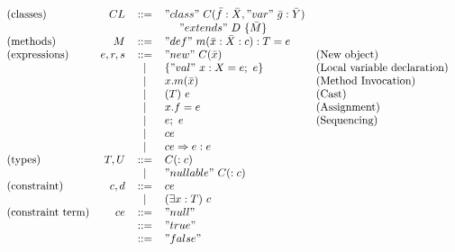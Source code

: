 \documentclass[nocopyrightspace,preprint,10pt]{sigplanconf}
\newcommand\alt{\bnf}
\newcommand\Implies{\Rightarrow}
\begin{document}
\begin{figure}
\[
\begin{array}{lrcll}
\mbox{(classes)}         & CL    &{::=}& "class"~C(\bar{f}:\bar{X}, "var"~\bar{g}:\bar{Y}) & \\
                         &       &     & ~~~~"extends"~D~\{\bar{M}\}                       & \\
\mbox{(methods)}         & M     &{::=}& "def"~m(\bar{x}:\bar{X} : c):T = e                & \\
\mbox{(expressions)}     & e,r,s &{::=}& "new"~C(\bar{x})                                  & \mbox{(New object)} \\
                         &       &\alt & \{ "val"~x:X=e;~e \}                              & \mbox{(Local variable declaration)} \\
                         &       &\alt & x.m(\bar{x})                                      & \mbox{(Method Invocation)} \\
                         &       &\alt & (T)~e                                             & \mbox{(Cast)} \\
                         &       &\alt & x.f=e                                             & \mbox{(Assignment)} \\
                         &       &\alt & e;~e                                              & \mbox{(Sequencing)} \\
                         &       &\alt & ce                                                & \\
                         &       &\alt & {ce \Implies e : e}                               & \\
\mbox{(types)}           & T,U   &{::=}& C(:c)                                             & \\
                         &       &\alt & "nullable"~C(:c)                                  & \\
\mbox{(constraint)}      & c,d   &{::=}& ce                                                & \\
                         &       &\alt & (\exists x:T)~c                                   & \\
\mbox{(constraint term)} & ce    &{::=}& "null"                                            & \\
                         &       &{::=}& "true"                                            & \\
                         &       &{::=}& "false"                                           & \\

\end{array}\]
\end{figure}
\end{document}
